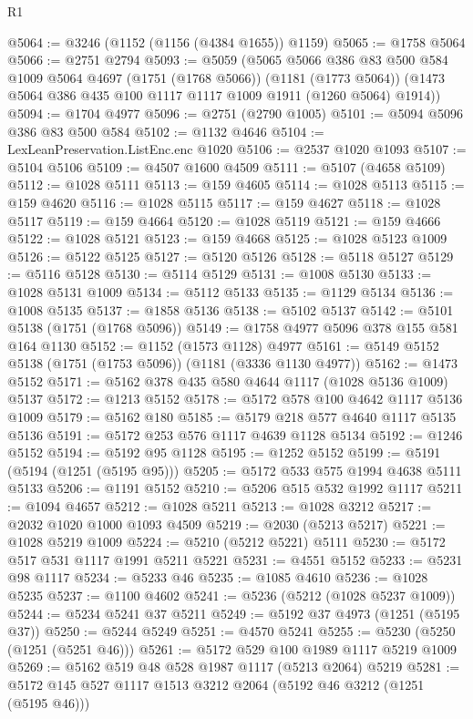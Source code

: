 \begin{lexlean}{R1}
\begin{coremodule}
@5064 := @3246 (@1152 (@1156 (@4384 @1655)) @1159)
@5065 := @1758 @5064
@5066 := @2751 @2794
@5093 := @5059
    (@5065
      @5066
      @386
      @83
      @500
      @584
      @1009
      @5064
      @4697
      (@1751 (@1768 @5066))
      (@1181 (@1773 @5064))
      (@1473 @5064 @386 @435 @100 @1117 @1117 @1009 @1911 (@1260 @5064) @1914))
@5094 := @1704 @4977
@5096 := @2751 (@2790 @1005)
@5101 := @5094 @5096 @386 @83 @500 @584
@5102 := @1132 @4646
@5104 := LexLeanPreservation.ListEnc.enc @1020
@5106 := @2537 @1020 @1093
@5107 := @5104 @5106
@5109 := @4507 @1600 @4509
@5111 := @5107 (@4658 @5109)
@5112 := @1028 @5111
@5113 := @159 @4605
@5114 := @1028 @5113
@5115 := @159 @4620
@5116 := @1028 @5115
@5117 := @159 @4627
@5118 := @1028 @5117
@5119 := @159 @4664
@5120 := @1028 @5119
@5121 := @159 @4666
@5122 := @1028 @5121
@5123 := @159 @4668
@5125 := @1028 @5123 @1009
@5126 := @5122 @5125
@5127 := @5120 @5126
@5128 := @5118 @5127
@5129 := @5116 @5128
@5130 := @5114 @5129
@5131 := @1008 @5130
@5133 := @1028 @5131 @1009
@5134 := @5112 @5133
@5135 := @1129 @5134
@5136 := @1008 @5135
@5137 := @1858 @5136
@5138 := @5102 @5137
@5142 := @5101 @5138 (@1751 (@1768 @5096))
@5149 := @1758 @4977 @5096 @378 @155 @581 @164 @1130
@5152 := @1152 (@1573 @1128) @4977
@5161 := @5149 @5152 @5138 (@1751 (@1753 @5096)) (@1181 (@3336 @1130 @4977))
@5162 := @1473 @5152
@5171 := @5162 @378 @435 @580 @4644 @1117 (@1028 @5136 @1009) @5137
@5172 := @1213 @5152
@5178 := @5172 @578 @100 @4642 @1117 @5136 @1009
@5179 := @5162 @180
@5185 := @5179 @218 @577 @4640 @1117 @5135 @5136
@5191 := @5172 @253 @576 @1117 @4639 @1128 @5134
@5192 := @1246 @5152
@5194 := @5192 @95 @1128
@5195 := @1252 @5152
@5199 := @5191 (@5194 (@1251 (@5195 @95)))
@5205 := @5172 @533 @575 @1994 @4638 @5111 @5133
@5206 := @1191 @5152
@5210 := @5206 @515 @532 @1992 @1117
@5211 := @1094 @4657
@5212 := @1028 @5211
@5213 := @1028 @3212
@5217 := @2032 @1020 @1000 @1093 @4509
@5219 := @2030 (@5213 @5217)
@5221 := @1028 @5219 @1009
@5224 := @5210 (@5212 @5221) @5111
@5230 := @5172 @517 @531 @1117 @1991 @5211 @5221
@5231 := @4551 @5152
@5233 := @5231 @98 @1117
@5234 := @5233 @46
@5235 := @1085 @4610
@5236 := @1028 @5235
@5237 := @1100 @4602
@5241 := @5236 (@5212 (@1028 @5237 @1009))
@5244 := @5234 @5241 @37 @5211
@5249 := @5192 @37 @4973 (@1251 (@5195 @37))
@5250 := @5244 @5249
@5251 := @4570 @5241
@5255 := @5230 (@5250 (@1251 (@5251 @46)))
@5261 := @5172 @529 @100 @1989 @1117 @5219 @1009
@5269 := @5162 @519 @48 @528 @1987 @1117 (@5213 @2064) @5219
@5281 := @5172 @145 @527 @1117 @1513 @3212 @2064 (@5192 @46 @3212 (@1251 (@5195 @46)))

\end{coremodule}
\end{lexlean}
